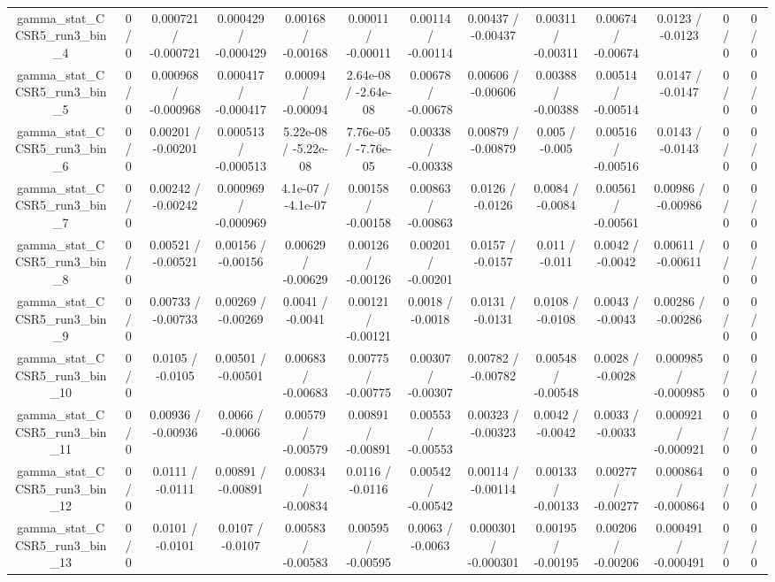 \documentclass[10pt]{article}
\begin{document}
\begin{table}[htbp]
\begin{center}
\begin{tabular}{|c|c|c|c|c|c|c|c|c|c|c|c|c|}
  gamma_stat_CCSR5_run3_bin_4 & 0 / 0 & 0.000721 / -0.000721 & 0.000429 / -0.000429 & 0.00168 / -0.00168 & 0.00011 / -0.00011 & 0.00114 / -0.00114 & 0.00437 / -0.00437 & 0.00311 / -0.00311 & 0.00674 / -0.00674 & 0.0123 / -0.0123 & 0 / 0 & 0 / 0 \\ 
  gamma_stat_CCSR5_run3_bin_5 & 0 / 0 & 0.000968 / -0.000968 & 0.000417 / -0.000417 & 0.00094 / -0.00094 & 2.64e-08 / -2.64e-08 & 0.00678 / -0.00678 & 0.00606 / -0.00606 & 0.00388 / -0.00388 & 0.00514 / -0.00514 & 0.0147 / -0.0147 & 0 / 0 & 0 / 0 \\ 
  gamma_stat_CCSR5_run3_bin_6 & 0 / 0 & 0.00201 / -0.00201 & 0.000513 / -0.000513 & 5.22e-08 / -5.22e-08 & 7.76e-05 / -7.76e-05 & 0.00338 / -0.00338 & 0.00879 / -0.00879 & 0.005 / -0.005 & 0.00516 / -0.00516 & 0.0143 / -0.0143 & 0 / 0 & 0 / 0 \\ 
  gamma_stat_CCSR5_run3_bin_7 & 0 / 0 & 0.00242 / -0.00242 & 0.000969 / -0.000969 & 4.1e-07 / -4.1e-07 & 0.00158 / -0.00158 & 0.00863 / -0.00863 & 0.0126 / -0.0126 & 0.0084 / -0.0084 & 0.00561 / -0.00561 & 0.00986 / -0.00986 & 0 / 0 & 0 / 0 \\ 
  gamma_stat_CCSR5_run3_bin_8 & 0 / 0 & 0.00521 / -0.00521 & 0.00156 / -0.00156 & 0.00629 / -0.00629 & 0.00126 / -0.00126 & 0.00201 / -0.00201 & 0.0157 / -0.0157 & 0.011 / -0.011 & 0.0042 / -0.0042 & 0.00611 / -0.00611 & 0 / 0 & 0 / 0 \\ 
  gamma_stat_CCSR5_run3_bin_9 & 0 / 0 & 0.00733 / -0.00733 & 0.00269 / -0.00269 & 0.0041 / -0.0041 & 0.00121 / -0.00121 & 0.0018 / -0.0018 & 0.0131 / -0.0131 & 0.0108 / -0.0108 & 0.0043 / -0.0043 & 0.00286 / -0.00286 & 0 / 0 & 0 / 0 \\ 
  gamma_stat_CCSR5_run3_bin_10 & 0 / 0 & 0.0105 / -0.0105 & 0.00501 / -0.00501 & 0.00683 / -0.00683 & 0.00775 / -0.00775 & 0.00307 / -0.00307 & 0.00782 / -0.00782 & 0.00548 / -0.00548 & 0.0028 / -0.0028 & 0.000985 / -0.000985 & 0 / 0 & 0 / 0 \\ 
  gamma_stat_CCSR5_run3_bin_11 & 0 / 0 & 0.00936 / -0.00936 & 0.0066 / -0.0066 & 0.00579 / -0.00579 & 0.00891 / -0.00891 & 0.00553 / -0.00553 & 0.00323 / -0.00323 & 0.0042 / -0.0042 & 0.0033 / -0.0033 & 0.000921 / -0.000921 & 0 / 0 & 0 / 0 \\ 
  gamma_stat_CCSR5_run3_bin_12 & 0 / 0 & 0.0111 / -0.0111 & 0.00891 / -0.00891 & 0.00834 / -0.00834 & 0.0116 / -0.0116 & 0.00542 / -0.00542 & 0.00114 / -0.00114 & 0.00133 / -0.00133 & 0.00277 / -0.00277 & 0.000864 / -0.000864 & 0 / 0 & 0 / 0 \\ 
  gamma_stat_CCSR5_run3_bin_13 & 0 / 0 & 0.0101 / -0.0101 & 0.0107 / -0.0107 & 0.00583 / -0.00583 & 0.00595 / -0.00595 & 0.0063 / -0.0063 & 0.000301 / -0.000301 & 0.00195 / -0.00195 & 0.00206 / -0.00206 & 0.000491 / -0.000491 & 0 / 0 & 0 / 0 \\ 

\end{tabular}
\end{center}
\end{table}
\end{document}

